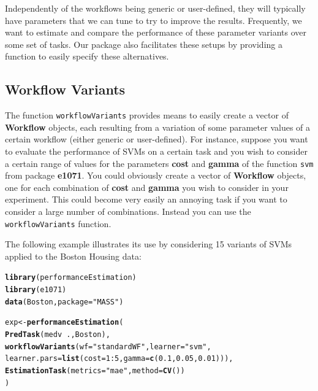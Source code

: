 \documentclass[10pt,a4paper]{article}\usepackage[]{graphicx}\usepackage[]{color}
\makeatletter
\newcommand{\hlnum}[1]{\textcolor[rgb]{0.686,0.059,0.569}{#1}}%
\newcommand{\hlstr}[1]{\textcolor[rgb]{0.192,0.494,0.8}{#1}}%
\newcommand{\hlopt}[1]{\textcolor[rgb]{0,0,0}{#1}}%
\newcommand{\hlstd}[1]{\textcolor[rgb]{0.345,0.345,0.345}{#1}}%
\newcommand{\hlkwb}[1]{\textcolor[rgb]{0.69,0.353,0.396}{#1}}%
\newcommand{\hlkwc}[1]{\textcolor[rgb]{0.333,0.667,0.333}{#1}}%
\newcommand{\hlkwd}[1]{\textcolor[rgb]{0.737,0.353,0.396}{\textbf{#1}}}%
\newenvironment{kframe}{%
 \def\at@end@of@kframe{}%
 \ifinner\ifhmode%
  \def\at@end@of@kframe{\end{minipage}}%
  \begin{minipage}{\columnwidth}%
 \fi\fi%
 \def\FrameCommand##1{\hskip\@totalleftmargin \hskip-\fboxsep
 \colorbox{shadecolor}{##1}\hskip-\fboxsep
     \hskip-\linewidth \hskip-\@totalleftmargin \hskip\columnwidth}%
 \MakeFramed {\advance\hsize-\width
   \@totalleftmargin\z@ \linewidth\hsize
   \@setminipage}}%
 {\par\unskip\endMakeFramed%
 \at@end@of@kframe}
\newenvironment{knitrout}{}{} %
\makeatother
\begin{document}
Independently of the workflows being generic or user-defined, they will typically have parameters that we can tune to try to improve the results. Frequently, we want to estimate and compare the performance of these parameter variants over some set of tasks. Our package also facilitates these setups by providing a function to easily specify these alternatives.

\subsection{Workflow Variants}\label{sec:variants}

The function \texttt{workflowVariants}  provides  means to easily create a vector of \textbf{Workflow} objects, each resulting from a variation of some parameter values of a certain workflow (either generic or user-defined). For instance, suppose you want to evaluate the performance of SVMs on a certain task and you wish to consider a certain range of values for the parameters \textbf{cost} and \textbf{gamma} of the function \texttt{svm} from package \textbf{e1071}. You could obviously create a vector of \textbf{Workflow} objects, one for each combination of \textbf{cost} and \textbf{gamma} you wish to consider in your experiment. This could become very easily an annoying task if you want to consider a large number of combinations. Instead you can use the \texttt{workflowVariants} function.

The following example illustrates its use by considering 15 variants of SVMs applied to the Boston Housing data:


\begin{knitrout}\footnotesize
{}\color{fgcolor}\begin{kframe}
\begin{alltt}
\hlkwd{library}\hlstd{(performanceEstimation)}
\hlkwd{library}\hlstd{(e1071)}
\hlkwd{data}\hlstd{(Boston,}\hlkwc{package}\hlstd{=}\hlstr{"MASS"}\hlstd{)}

\hlstd{exp} \hlkwb{<-} \hlkwd{performanceEstimation}\hlstd{(}
         \hlkwd{PredTask}\hlstd{(medv} \hlopt{~} \hlstd{.,Boston),}
         \hlkwd{workflowVariants}\hlstd{(}\hlkwc{wf}\hlstd{=}\hlstr{"standardWF"}\hlstd{,}\hlkwc{learner}\hlstd{=}\hlstr{"svm"}\hlstd{,}
                          \hlkwc{learner.pars}\hlstd{=}\hlkwd{list}\hlstd{(}\hlkwc{cost}\hlstd{=}\hlnum{1}\hlopt{:}\hlnum{5}\hlstd{,}\hlkwc{gamma}\hlstd{=}\hlkwd{c}\hlstd{(}\hlnum{0.1}\hlstd{,}\hlnum{0.05}\hlstd{,}\hlnum{0.01}\hlstd{))),}
         \hlkwd{EstimationTask}\hlstd{(}\hlkwc{metrics}\hlstd{=}\hlstr{"mae"}\hlstd{,}\hlkwc{method}\hlstd{=}\hlkwd{CV}\hlstd{())}
         \hlstd{)}
\end{alltt}
\end{kframe}
\end{knitrout}
\end{document}

